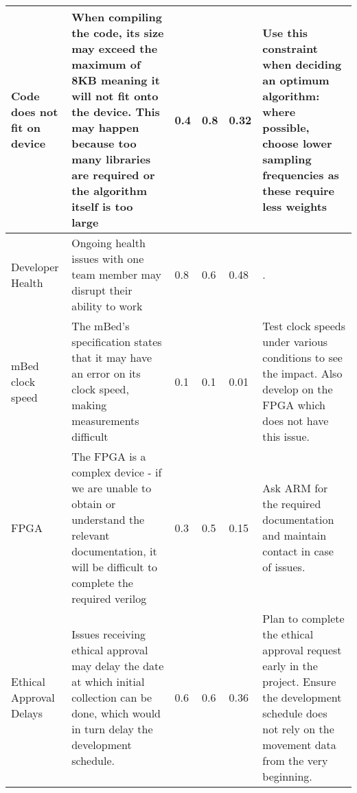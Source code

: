 \begin{landscape}
\begin{center}
\begin{tabular}{ | m{2cm} | m{4cm} | m{1cm} | m{1cm} | m{1cm} | m{5cm} | }
  Code does not fit on device &
  When compiling the code, its size may exceed the maximum of 8KB meaning it will not fit onto the device. This may happen because too many libraries are required or the algorithm itself is too large &
  0.4 & 0.8 & 0.32 &
  Use this constraint when deciding an optimum algorithm: where possible, choose lower sampling frequencies as these require less weights \\
  \hline
  
  Developer Health &
  Ongoing health issues with one team member may disrupt their ability to work &
  0.8 & 0.6 & 0.48 &
  . \\
  \hline
  
  mBed clock speed &
  The mBed's specification states that it may have an error on its clock speed, making measurements difficult &
  0.1 & 0.1 & 0.01 &
  Test clock speeds under various conditions to see the impact. Also develop on the FPGA which does not have this issue. \\
  \hline
  
  FPGA &
  The FPGA is a complex device - if we are unable to obtain or understand the relevant documentation, it will be difficult to complete the required verilog &
  0.3 & 0.5 & 0.15 &
  Ask ARM for the required documentation and maintain contact in case of issues. \\
  \hline
  
  Ethical Approval Delays &
  Issues receiving ethical approval may delay the date at which initial collection can be done, which would in turn delay the development schedule. &
  0.6 & 0.6 & 0.36 &
  Plan to complete the ethical approval request early in the project. Ensure the development schedule does not rely on the movement data from the very beginning. \\
  \hline
 
\end{tabular}
\end{center}
\end{landscape}
